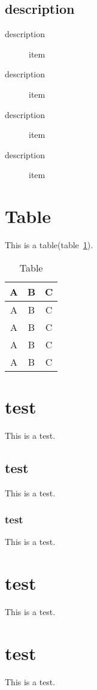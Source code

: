 \documentclass[twoside]{article}
\begin{document}
\subsection{description}
\begin{description}
\item [description] item
\item [description] item
\item [description] item
\item [description] item
\end{description}

\newpage

\section{Table}
This is a table(table~\ref{tab:table}).

\begin{table}
\begin{center}
\caption{Table}\label{tab:table}
\begin{tabular}{|c|c|c|}
\hline
A & B & C \\\hline
A & B & C \\\hline
A & B & C \\\hline
A & B & C \\\hline
A & B & C \\\hline
\end{tabular}
\end{center}
\end{table}



\section{test}
This is a test.
\subsection{test}
This is a test.
\subsubsection{test}
This is a test.


\section{test}
This is a test.


\section{test}
This is a test.
\end{document}

